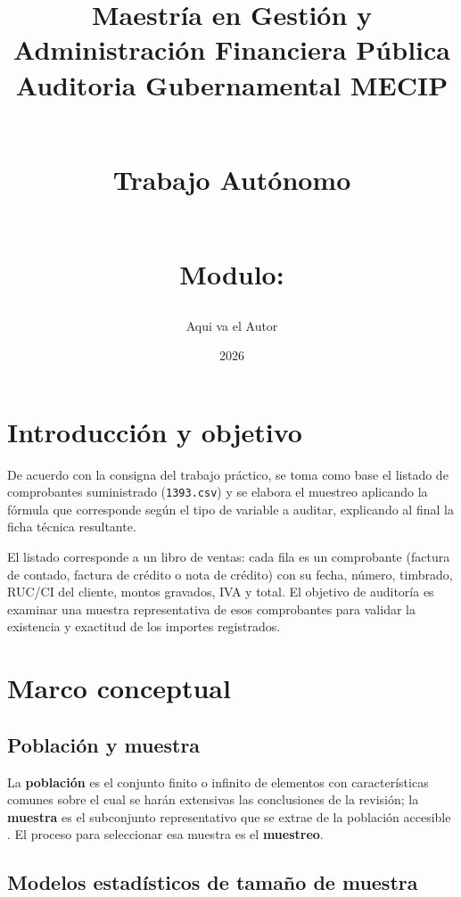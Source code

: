 \documentclass[12pt, a4paper]{article}
\title{%

    \textbf{Maestría en Gestión y Administración Financiera Pública}\\[6pt]
    {\large Auditoria Gubernamental MECIP}\\\

    \large Trabajo Autónomo\\\
    
    \large Modulo: 
    
}
\author{%
    Aqui va el Autor\\[6pt]
}
\date{2026}
\theoremstyle{plain}
\theoremstyle{definition}
\theoremstyle{remark}
\begin{document}

\maketitle
\thispagestyle{empty}

\newpage
\tableofcontents
\newpage

\section{Introducción y objetivo}

De acuerdo con la consigna del trabajo práctico, se toma como base el listado
de comprobantes suministrado (\texttt{1393.csv}) y se elabora el muestreo
aplicando la fórmula que corresponde según el tipo de variable a auditar,
explicando al final la ficha técnica resultante.

El listado corresponde a un libro de ventas: cada fila es un comprobante
(factura de contado, factura de crédito o nota de crédito) con su fecha,
número, timbrado, RUC/CI del cliente, montos gravados, IVA y total. El
objetivo de auditoría es examinar una muestra representativa de esos
comprobantes para validar la existencia y exactitud de los importes
registrados.

\section{Marco conceptual}

\subsection{Población y muestra}

La \textbf{población} es el conjunto finito o infinito de elementos con
características comunes sobre el cual se harán extensivas las conclusiones
de la revisión; la \textbf{muestra} es el subconjunto representativo que se
extrae de la población accesible \cite{cofae}. El proceso para seleccionar
esa muestra es el \textbf{muestreo}.

\subsection{Modelos estadísticos de tamaño de muestra}
\end{document}
